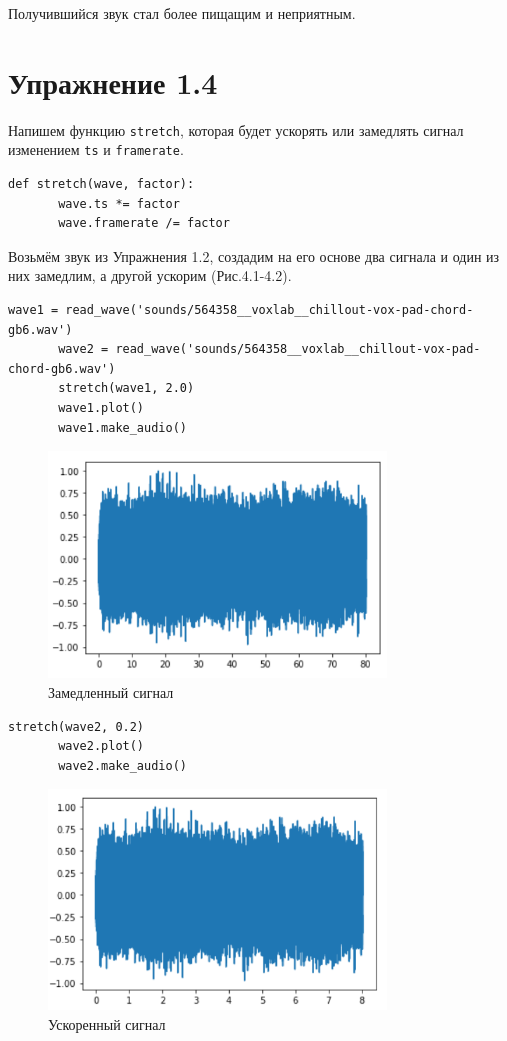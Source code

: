 \documentclass[a4paper,12pt]{report}
\begin{document}
    Получившийся звук стал более пищащим и неприятным.
    
\chapter{Упражнение 1.4}
    Напишем функцию \texttt{stretch}, которая будет ускорять или замедлять сигнал изменением \texttt{ts} и \texttt{framerate}.
\begin{lstlisting}[caption=Функция stretch]
       def stretch(wave, factor):
       wave.ts *= factor
       wave.framerate /= factor
\end{lstlisting} 
    
    Возьмём звук из Упражнения 1.2, создадим на его основе два сигнала и один из них замедлим, а другой ускорим (Рис.4.1-4.2).
\begin{lstlisting}[caption=Замедление сигнала]
       wave1 = read_wave('sounds/564358__voxlab__chillout-vox-pad-chord-gb6.wav')
       wave2 = read_wave('sounds/564358__voxlab__chillout-vox-pad-chord-gb6.wav')
       stretch(wave1, 2.0)
       wave1.plot()
       wave1.make_audio()
\end{lstlisting}
\begin{figure}[H]
        \centering
        \includegraphics[width=0.8\textwidth]{fig4-1.PNG}
        \caption{Замедленный сигнал}
        \label{fig:fig4-1}
\end{figure} 

\begin{lstlisting}[caption=Ускорение сигнала]
       stretch(wave2, 0.2)
       wave2.plot()
       wave2.make_audio()
\end{lstlisting}
\begin{figure}[H]
        \centering
        \includegraphics[width=0.8\textwidth]{fig4-2.PNG}
        \caption{Ускоренный сигнал}
        \label{fig:fig4-2}
\end{figure} 
  
\end{document}
